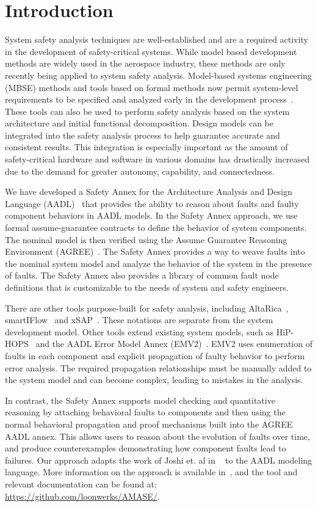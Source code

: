 \section{Introduction}
System safety analysis techniques are well-established and are a required activity in the development of safety-critical systems. While model based development methods are widely used in the aerospace industry, these methods are only recently being applied to system safety analysis. Model-based systems engineering (MBSE) methods and tools based on formal methods now permit system-level requirements to be specified and analyzed early in the development process~\cite{NFM2012:CoGaMiWhLaLu,CAV2015:BoCiGrMa}. These tools can also be used to perform safety analysis based on the system architecture and initial functional decomposition. Design models can be integrated into the safety analysis process to help guarantee accurate and consistent results. This integration is especially important as the amount of safety-critical hardware and software in various domains has drastically increased due to the demand for greater autonomy, capability, and connectedness.

We have developed a Safety Annex for the Architecture Analysis and Design Language (AADL)~\cite{FeilerModelBasedEngineering2012} that provides the ability to reason about faults and faulty component behaviors in AADL models. In the Safety Annex approach, we use formal assume-guarantee contracts to define the behavior of system components. The nominal model is then verified using the Assume Guarantee Reasoning Environment (AGREE)~\cite{NFM2012:CoGaMiWhLaLu}. The Safety Annex  provides a way to weave faults into the nominal system model and analyze the behavior of the system in the presence of faults. The Safety Annex also provides a library of common fault node definitions that is customizable to the needs of system and safety engineers.

There are other tools purpose-built for safety analysis, including AltaRica~\cite{PROSVIRNOVA2013127}, smartIFlow~\cite{info8010007} and xSAP~\cite{DBLP:conf/tacas/BittnerBCCGGMMZ16}. These notations are separate from the system development model. Other tools extend existing system models, such as HiP-HOPS~\cite{CHEN201391} and the AADL Error Model Annex (EMV2)~\cite{EMV2}. EMV2 uses enumeration of faults in each component and explicit propagation of faulty behavior to perform error analysis. The required propagation relationships must be manually added to the system model and can become complex, leading to mistakes in the analysis.

In contrast, the Safety Annex supports model checking and quantitative reasoning by attaching behavioral faults to components and then using the normal behavioral propagation and proof mechanisms built into the AGREE AADL annex.  This allows users to reason about the evolution of faults over time, and produce counterexamples demonstrating how component faults lead to failures.
Our approach adapts the work of Joshi et. al in
~\cite{Joshi05:Dasc} to the AADL modeling language.  More information on the approach is available in~\cite{Stewart17:IMBSA}, and the tool and relevant documentation can be found at: \small \url{https://github.com/loonwerks/AMASE/}. \normalsize 